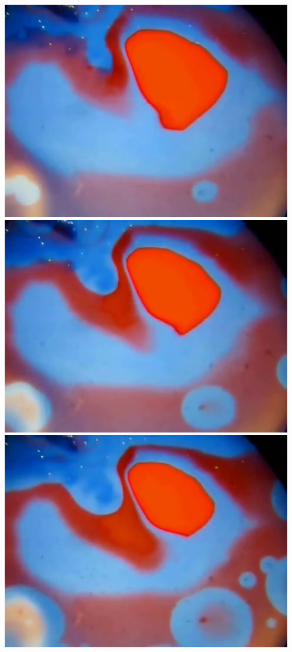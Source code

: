 \documentclass[12pt]{report}
\begin{document}
{\includegraphics[scale=0.25]{BZ-frames0006.png}
\includegraphics[scale=0.25]{BZ-frames0007.png}
\includegraphics[scale=0.25]{BZ-frames0008.png}
}
\end{document}
